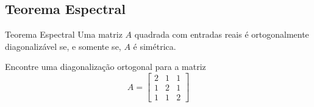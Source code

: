 \subsection*{Teorema Espectral}

\begin{frame}[label=orto]{}

\begin{block}{Teorema Espectral}
Uma matriz  $A$ quadrada com entradas reais  é ortogonalmente diagonalizável se, e somente se, $A$ é simétrica.
\end{block}

\begin{exe}
Encontre  uma diagonalização ortogonal para a matriz
\[A=
\begin{bmatrix}
2 & 1 & 1\\ 1& 2 & 1 \\ 1 & 1 & 2
\end{bmatrix}
\]
\end{exe}

\end{frame}
